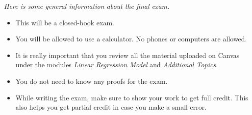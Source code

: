 \documentclass{./../../Latex/handout}
\begin{document}
\thispagestyle{plain}

\textit{Here is some general information about the final exam.}
\begin{itemize}
\item This will be a closed-book exam.
\item You will be allowed to use a calculator. No phones or computers are allowed. 
\item It is really important that you review all the material uploaded on Canvas under the modules \textit{Linear Regression Model} and \textit{Additional Topics}.
\item You do not need to know any proofs for the exam.

\item While writing the exam, make sure to show your work to get full credit. This also helps you get partial credit in case you make a small error.
\end{itemize}
\end{document}
